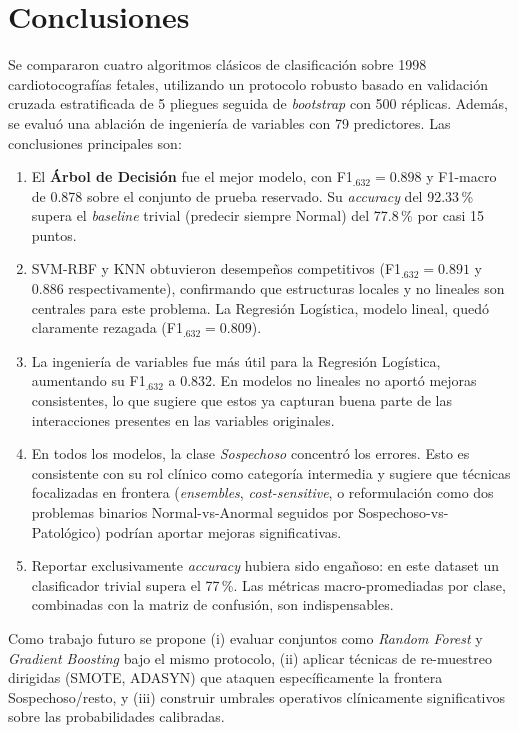 \documentclass[conference]{IEEEtran}
\begin{document}
\section{Conclusiones}
Se compararon cuatro algoritmos cl\'asicos de clasificaci\'on sobre 1998 cardiotocograf\'ias fetales, utilizando un protocolo robusto basado en validaci\'on cruzada estratificada de 5 pliegues seguida de \emph{bootstrap} con 500 r\'eplicas. Adem\'as, se evalu\'o una ablaci\'on de ingenier\'ia de variables con 79 predictores. Las conclusiones principales son:

\begin{enumerate}
    \item El \textbf{\'Arbol de Decisi\'on} fue el mejor modelo, con F1$_{.632}=0.898$ y F1-macro de 0.878 sobre el conjunto de prueba reservado. Su \emph{accuracy} del 92.33\,\% supera el \emph{baseline} trivial (predecir siempre Normal) del 77.8\,\% por casi 15 puntos.
    \item SVM-RBF y KNN obtuvieron desempe\~nos competitivos (F1$_{.632}=0.891$ y $0.886$ respectivamente), confirmando que estructuras locales y no lineales son centrales para este problema. La Regresi\'on Log\'istica, modelo lineal, qued\'o claramente rezagada (F1$_{.632}=0.809$).
    \item La ingenier\'ia de variables fue m\'as \'util para la Regresi\'on Log\'istica, aumentando su F1$_{.632}$ a 0.832. En modelos no lineales no aport\'o mejoras consistentes, lo que sugiere que estos ya capturan buena parte de las interacciones presentes en las variables originales.
    \item En todos los modelos, la clase \emph{Sospechoso} concentr\'o los errores. Esto es consistente con su rol cl\'inico como categor\'ia intermedia y sugiere que t\'ecnicas focalizadas en frontera (\emph{ensembles}, \emph{cost-sensitive}, o reformulaci\'on como dos problemas binarios Normal-vs-Anormal seguidos por Sospechoso-vs-Patol\'ogico) podr\'ian aportar mejoras significativas.
    \item Reportar exclusivamente \emph{accuracy} hubiera sido enga\~noso: en este dataset un clasificador trivial supera el 77\,\%. Las m\'etricas macro-promediadas por clase, combinadas con la matriz de confusi\'on, son indispensables.
\end{enumerate}

Como trabajo futuro se propone (i) evaluar conjuntos como \emph{Random Forest} y \emph{Gradient Boosting} bajo el mismo protocolo, (ii) aplicar t\'ecnicas de re-muestreo dirigidas (SMOTE, ADASYN) que ataquen espec\'ificamente la frontera Sospechoso/resto, y (iii) construir umbrales operativos cl\'inicamente significativos sobre las probabilidades calibradas.
\end{document}
